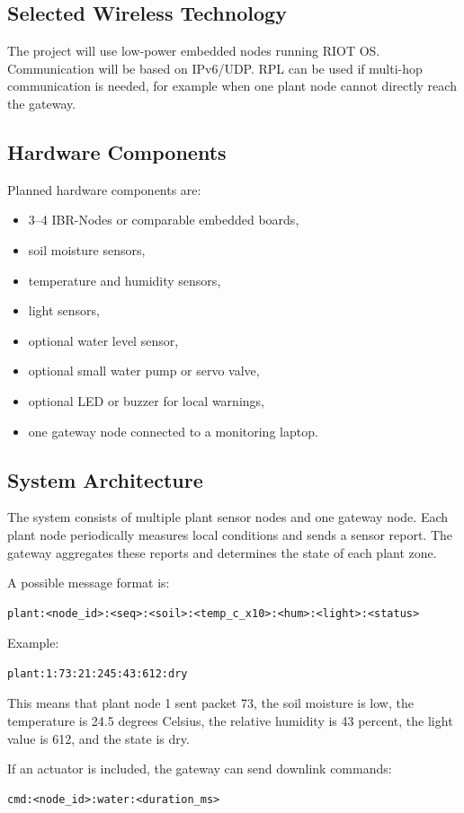 \documentclass[11pt,a4paper]{article}
\newcommand{\projecttitle}[1]{\subsection*{#1}}
\begin{document}
\projecttitle{Selected Wireless Technology}

The project will use low-power embedded nodes running RIOT OS. Communication will be based on IPv6/UDP. RPL can be used if multi-hop communication is needed, for example when one plant node cannot directly reach the gateway.

\projecttitle{Hardware Components}

Planned hardware components are:

\begin{itemize}
    \item 3--4 IBR-Nodes or comparable embedded boards,
    \item soil moisture sensors,
    \item temperature and humidity sensors,
    \item light sensors,
    \item optional water level sensor,
    \item optional small water pump or servo valve,
    \item optional LED or buzzer for local warnings,
    \item one gateway node connected to a monitoring laptop.
\end{itemize}

\projecttitle{System Architecture}

The system consists of multiple plant sensor nodes and one gateway node. Each plant node periodically measures local conditions and sends a sensor report. The gateway aggregates these reports and determines the state of each plant zone.

A possible message format is:

\begin{verbatim}
plant:<node_id>:<seq>:<soil>:<temp_c_x10>:<hum>:<light>:<status>
\end{verbatim}

Example:

\begin{verbatim}
plant:1:73:21:245:43:612:dry
\end{verbatim}

This means that plant node 1 sent packet 73, the soil moisture is low, the temperature is 24.5 degrees Celsius, the relative humidity is 43 percent, the light value is 612, and the state is dry.

If an actuator is included, the gateway can send downlink commands:

\begin{verbatim}
cmd:<node_id>:water:<duration_ms>
\end{verbatim}
\end{document}

